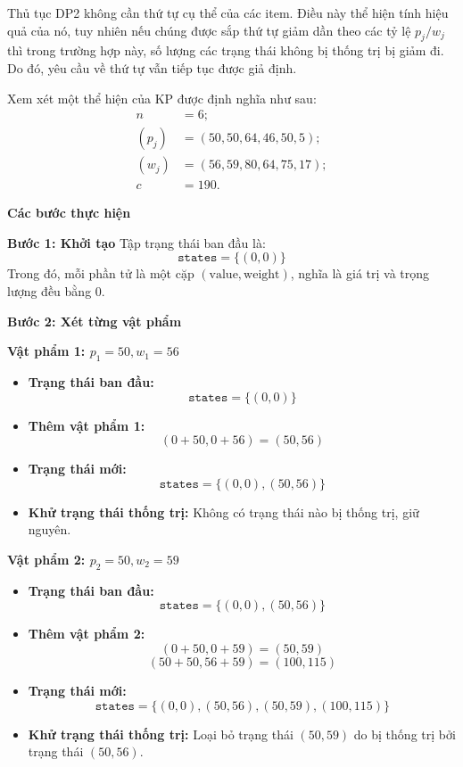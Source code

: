 Thủ tục DP2 không cần thứ tự cụ thể của các item. Điều này thể hiện tính hiệu quả của nó, tuy nhiên nếu chúng được sắp thứ tự giảm dần theo các tỷ lệ $p_j / w_j$ thì trong trường hợp này, số lượng các trạng thái không bị thống trị bị giảm đi. Do đó, yêu cầu về thứ tự vẫn tiếp tục được giả định.   

\begin{example}
    \label{example:2.3}
    Xem xét một thể hiện của KP được định nghĩa như sau:
    \begin{equation*}
        \begin{split}
            n &= 6;\\
            (p_j) &= (50, 50, 64, 46, 50, 5);\\
            (w_j) &= (56, 59, 80, 64, 75, 17);\\
            c & = 190.
        \end{split}
    \end{equation*}

\textbf{Các bước thực hiện}

\textbf{Bước 1: Khởi tạo}
Tập trạng thái ban đầu là:
\[
\texttt{states} = \{(0, 0)\}
\]
Trong đó, mỗi phần tử là một cặp \((\text{value}, \text{weight})\), nghĩa là giá trị và trọng lượng đều bằng 0.

\textbf{Bước 2: Xét từng vật phẩm}

\textbf{Vật phẩm 1: \( p_1 = 50, w_1 = 56 \)}
\begin{itemize}
    \item \textbf{Trạng thái ban đầu:}
    \[
    \texttt{states} = \{(0, 0)\}
    \]
    \item \textbf{Thêm vật phẩm 1:}
    \[
    (0 + 50, 0 + 56) = (50, 56)
    \]
    \item \textbf{Trạng thái mới:}
    \[
    \texttt{states} = \{(0, 0), (50, 56)\}
    \]
    \item \textbf{Khử trạng thái thống trị:} Không có trạng thái nào bị thống trị, giữ nguyên.
\end{itemize}

\textbf{Vật phẩm 2: \( p_2 = 50, w_2 = 59 \)}
\begin{itemize}
    \item \textbf{Trạng thái ban đầu:}
    \[
    \texttt{states} = \{(0, 0), (50, 56)\}
    \]
    \item \textbf{Thêm vật phẩm 2:}
    \[
    (0 + 50, 0 + 59) = (50, 59)
    \]
    \[
    (50 + 50, 56 + 59) = (100, 115)
    \]
    \item \textbf{Trạng thái mới:}
    \[
    \texttt{states} = \{(0, 0), (50, 56), (50, 59), (100, 115)\}
    \]
    \item \textbf{Khử trạng thái thống trị:} Loại bỏ trạng thái $(50, 59)$ do bị thống trị bởi trạng thái $(50, 56)$.
\end{itemize}


\end{example}
